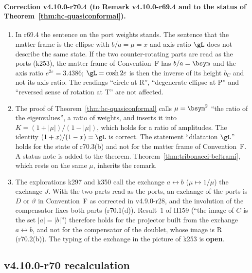 \paragraph{Correction v4.10.0-r70.4 (to Remark v4.10.0-r69.4 and to the status of Theorem~\ref{thm:hc-quasiconformal}).}
\begin{enumerate}[leftmargin=2em]
\item[(a)] In r69.4 the sentence on the port weights stands.  The sentence that the matter frame is the ellipse with \(b/a=\mu=x\) and axis
ratio \(\gL\) does not describe the same state.  If the two counter-rotating parts are read as the ports (k253), the matter frame of
Convention~F has \(b/a=\bsym\) and the axis ratio \(e^{2\varepsilon}=3.4386\); \(\gL=\cosh2\varepsilon\) is then the inverse of its height
\(b_C\) and not its axis ratio.  The readings ``circle at R'', ``degenerate ellipse at P'' and ``reversed sense of rotation at T'' are not
affected.
\item[(b)] The proof of Theorem~\ref{thm:hc-quasiconformal} calls \(\mu=\bsym^2\) ``the ratio of the eigenvalues'', a ratio of weights, and
inserts it into \(K=(1+|\mu|)/(1-|\mu|)\), which holds for a ratio of amplitudes.  The identity \((1+x)/(1-x)=\gL\) is correct.  The statement
``dilatation \(\gL\)'' holds for the state of r70.3(b) and not for the matter frame of Convention~F.  A status note is added to the theorem.
Theorem~\ref{thm:tribonacci-beltrami}, which rests on the same \(\mu\), inherits the remark.
\item[(c)] The explorations k297 and k350 call the exchange \(a\leftrightarrow b\) (\(\mu\mapsto1/\mu\)) the exchange \(J\).  With the two parts
read as the ports, an exchange of the ports is \(D\) or \(\vartheta\) in Convention~F as corrected in v4.9.0-r28, and the involution of the
compensator fixes both parts (r70.1(d)).  Result~1 of H159 (``the image of \(C\) is the set \(|a|=|b|\)'') therefore holds for the projector
built from the exchange \(a\leftrightarrow b\), and not for the compensator of the doublet, whose image is R (r70.2(b)).  The typing of the
exchange in the picture of k253 is \textbf{open}.
\end{enumerate}

\subsection*{v4.10.0-r70 recalculation}
\label{subsec:v4100-r70-recalculation}


